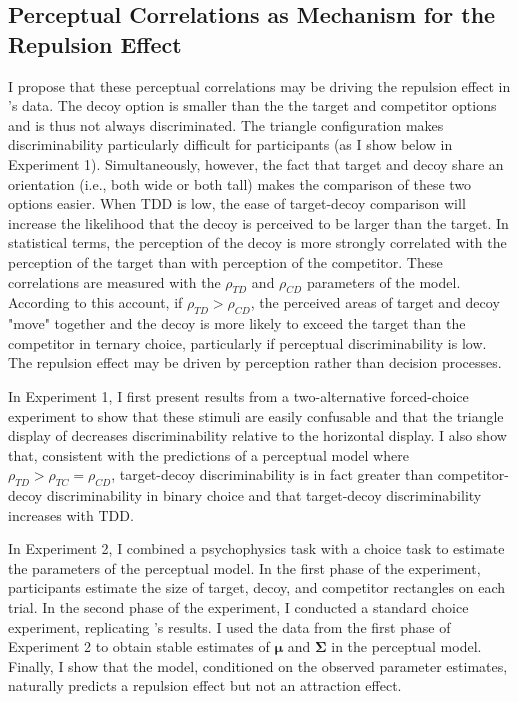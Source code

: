 \subsection{Perceptual Correlations as Mechanism for the Repulsion Effect}
I propose that these perceptual correlations may be driving the repulsion effect in \textcite{spektorWhenGoodLooks2018b}'s data. The decoy option is smaller than the the target and competitor options and is thus not always discriminated. The triangle configuration makes discriminability particularly difficult for participants (as I show below in Experiment 1). Simultaneously, however, the fact that target and decoy share an orientation (i.e., both wide or both tall) makes the comparison of these two options easier. When TDD is low, the ease of target-decoy comparison will increase the likelihood that the decoy is perceived to be larger than the target. In statistical terms, the perception of the decoy is more strongly correlated with the perception of the target than with perception of the competitor. These correlations are measured with the $\rho_{TD}$ and $\rho_{CD}$ parameters of the model. According to this account, if $\rho_{TD}>\rho_{CD}$, the perceived areas of target and decoy "move" together and the decoy is more likely to exceed the target than the competitor in ternary choice, particularly if perceptual discriminability is low. The repulsion effect may be driven by perception rather than decision processes. 

In Experiment 1, I first present results from a two-alternative forced-choice experiment to show that these stimuli are easily confusable and that the triangle display of \textcite{spektorWhenGoodLooks2018b} decreases discriminability relative to the horizontal display. I also show that, consistent with the predictions of a perceptual model where $\rho_{TD}>\rho_{TC}=\rho_{CD}$, target-decoy discriminability is in fact greater than competitor-decoy discriminability in binary choice and that target-decoy discriminability increases with TDD. 

In Experiment 2, I combined a psychophysics task with a choice task to estimate the parameters of the perceptual model. In the first phase of the experiment, participants estimate the size of target, decoy, and competitor rectangles on each trial. In the second phase of the experiment, I conducted a standard choice experiment, replicating \textcite{spektorWhenGoodLooks2018b}'s results. I used the data from the first phase of Experiment 2 to obtain stable estimates of  $\boldsymbol{\mu}$ and $\boldsymbol{\Sigma}$ in the perceptual model. Finally, I show that the model, conditioned on the observed parameter estimates, naturally predicts a repulsion effect but not an attraction effect.  

